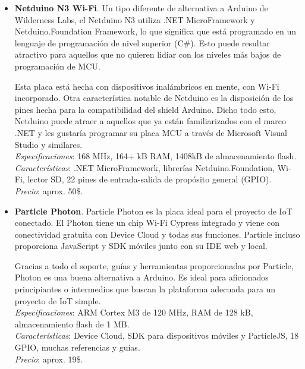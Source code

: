 \documentclass[12pt]{article}
\begin{document}
\begin{itemize}
		\item \textbf{Netduino N3 Wi-Fi}. Un tipo diferente de alternativa a Arduino de Wilderness Labs, el Netduino N3 utiliza .NET MicroFramework y Netduino.Foundation Framework, lo que significa que está programado en un lenguaje de programación de nivel superior (C\#). Esto puede resultar atractivo para aquellos que no quieren lidiar con los niveles más bajos de programación de MCU.
		
		Esta placa está hecha con dispositivos inalámbricos en mente, con Wi-Fi incorporado. Otra característica notable de Netduino es la disposición de los pines hecha para la compatibilidad del shield Arduino. Dicho todo esto, Netduino puede atraer a aquellos que ya están familiarizados con el marco .NET y les gustaría programar su placa MCU a través de Microsoft Visual Studio y similares. \\
		
		\textit{Especificaciones}: 168 MHz, 164+ kB RAM, 1408kB de almacenamiento flash.  \\
		
		\textit{Características}: .NET  MicroFramework, librerías Netduino.Foundation, Wi-Fi, lector SD,  22 pines de entrada-salida de propósito general (GPIO). \\
		
		\textit{Precio}: aprox. 50\$. \\
		
		\item \textbf{Particle Photon}. Particle Photon es la placa ideal para el proyecto de IoT conectado. El Photon tiene un chip Wi-Fi Cypress integrado y viene con conectividad gratuita con Device Cloud y todas sus funciones. Particle incluso proporciona JavaScript y SDK móviles junto con su IDE web y local.
		
		Gracias a todo el soporte, guías y herramientas proporcionadas por Particle, Photon es una buena alternativa a Arduino. Es ideal para aficionados principiantes o intermedios que buscan la plataforma adecuada para un proyecto de IoT simple. \\
		
		\textit{Especificaciones}:  ARM Cortex M3 de 120 MHz, RAM de 128 kB, almacenamiento flash de 1 MB.\\
		
		\textit{Características}: Device Cloud, SDK para dispositivos móviles y ParticleJS, 18 GPIO, muchas referencias y guías. \\
		
		\textit{Precio}: aprox. 19\$.\\
		

\end{itemize}
\end{document}
